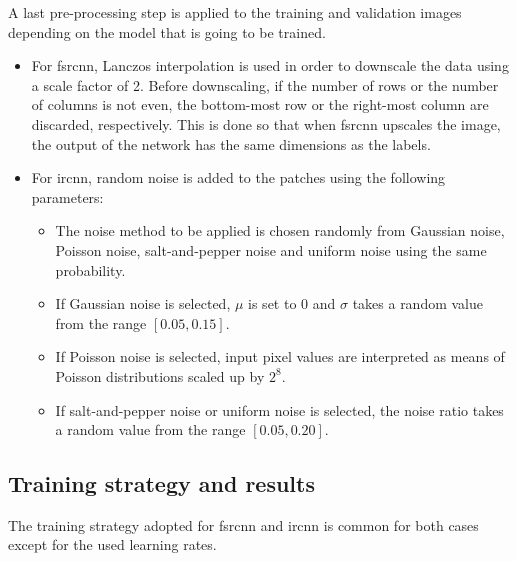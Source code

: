 A last pre-processing step is applied to the training and validation images depending on the model that is going to be trained.
\begin{itemize}
	\item For \gls{fsrcnn}, Lanczos interpolation is used in order to downscale the data using a scale factor of 2. Before downscaling, if the number of rows or the number of columns is not even, the bottom-most row or the right-most column are discarded, respectively. This is done so that when \gls{fsrcnn} upscales the image, the output of the network has the same dimensions as the labels.
	\item For \gls{ircnn}, random noise is added to the patches using the following parameters:
	\begin{itemize}
		\item The noise method to be applied is chosen randomly from Gaussian noise, Poisson noise, salt-and-pepper noise and uniform noise using the same probability.
		\item If Gaussian noise is selected, $\mu$ is set to 0 and $\sigma$ takes a random value from the range $[0.05, 0.15]$.
		\item If Poisson noise is selected, input pixel values are interpreted as means of Poisson distributions scaled up by $2^8$.
		\item If salt-and-pepper noise or uniform noise is selected, the noise ratio takes a random value from the range $[0.05, 0.20]$.
	\end{itemize}
\end{itemize}

\subsection{Training strategy and results}
The training strategy adopted for \gls{fsrcnn} and \gls{ircnn} is common for both cases except for the used learning rates.

